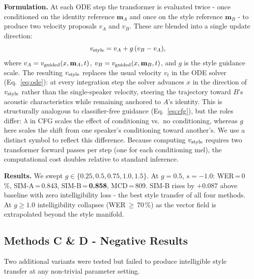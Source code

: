 \documentclass[11pt,a4paper,twocolumn]{article}
\begin{document}
\textbf{Formulation.}
At each ODE step the transformer is evaluated twice - once
conditioned on the identity reference $\mathbf{m}_A$ and once on the
style reference $\mathbf{m}_B$ - to produce two velocity proposals
$v_A$ and $v_B$.  These are blended into a single update direction:
\begin{equation}
  v_{\rm style} = v_A + g\,(v_B - v_A),
  \label{eq:methb}
\end{equation}
where $v_A = v_{\rm guided}(x,\mathbf{m}_A,t)$,\;
$v_B = v_{\rm guided}(x,\mathbf{m}_B,t)$, and $g$ is the style
guidance scale.  The resulting $v_{\rm style}$ replaces the usual
velocity $v_t$ in the ODE solver (Eq.~\ref{eq:ode}): at every
integration step the solver advances $x$ in the direction of
$v_{\rm style}$ rather than the single-speaker velocity, steering the
trajectory toward $B$'s acoustic characteristics while remaining
anchored to $A$'s identity.
This is structurally analogous to classifier-free guidance
(Eq.~\ref{eq:cfg}), but the roles differ: $\lambda$ in CFG scales
the effect of conditioning vs.\ no conditioning, whereas $g$ here
scales the shift from one speaker's conditioning toward another's.
We use a distinct symbol to reflect this difference.
Because computing $v_{\rm style}$ requires two transformer forward
passes per step (one for each conditioning mel), the computational
cost doubles relative to standard inference.

\textbf{Results.} We swept $g\in\{0.25,0.5,0.75,1.0,1.5\}$.
At $g=0.5$, $s=-1.0$: WER\,=\,0\,\%, SIM-A\,=\,0.843,
SIM-B\,=\,\textbf{0.858}, MCD\,=\,809. SIM-B rises by $+0.087$ above
baseline with zero intelligibility loss - the best style transfer of all four
methods.  At $g\geq1.0$ intelligibility collapses (WER\,$\geq$\,70\,\%) as
the vector field is extrapolated beyond the style manifold.

\subsection{Methods C \& D - Negative Results}

Two additional variants were tested but failed to produce intelligible style
transfer at any non-trivial parameter setting.
\end{document}
